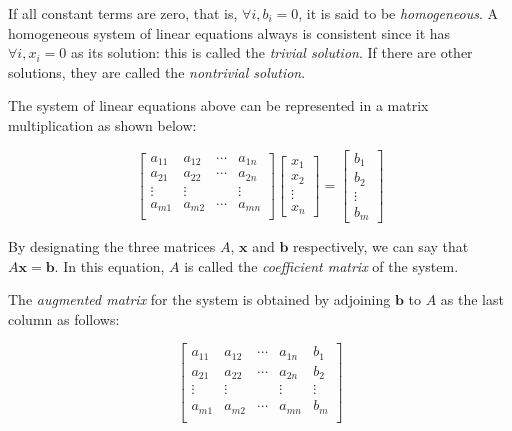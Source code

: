 \documentclass{report}
\begin{document}
		If all constant terms are zero, that is, $\forall i, b_i=0$, it is said to be \emph{homogeneous}. A homogeneous system of linear equations always is consistent since it has $\forall i, x_i=0$ as its solution: this is called the \emph{trivial solution}. If there are other solutions, they are called the \emph{nontrivial solution}.
		
		The system of linear equations above can be represented in a matrix multiplication as shown below:
		
		\begin{displaymath}
			\begin{bmatrix}
				a_{11} & a_{12} & \cdots & a_{1n} \\
				a_{21} & a_{22} & \cdots & a_{2n} \\
				\vdots & \vdots &        & \vdots \\
				a_{m1} & a_{m2} & \cdots & a_{mn} \\
			\end{bmatrix}
			\begin{bmatrix}
				x_1 \\ x_2 \\ \vdots \\ x_n
			\end{bmatrix}
			=
			\begin{bmatrix}
				b_1 \\ b_2 \\ \vdots \\ b_m
			\end{bmatrix}
		\end{displaymath}
		
		By designating the three matrices $A$, $\bm{x}$ and $\bm{b}$ respectively, we can say that $A\bm{x}=\bm{b}$. In this equation, $A$ is called the \emph{coefficient matrix} of the system.
		
		The \emph{augmented matrix} for the system is obtained by adjoining $\bm{b}$ to $A$ as the last column as follows:
		
		\begin{displaymath}
			\left[\begin{array}{cccc|c}
				a_{11} & a_{12} & \cdots & a_{1n} & b_1\\
				a_{21} & a_{22} & \cdots & a_{2n} & b_2\\
				\vdots & \vdots &        & \vdots & \vdots\\
				a_{m1} & a_{m2} & \cdots & a_{mn} & b_m\\
			\end{array}\right]
		\end{displaymath}
		
\end{document}
